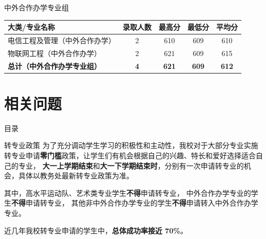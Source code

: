 \documentclass[aspectratio=169, utf8, fontset=windows]{beamer}
\begin{document}
\begin{frame}{中外合作办学专业组}
    \begin{table}
        \centering
        \begin{tabular}{lcccc}
            \toprule
            \textcolor{Fore}{\textbf{大类/专业名称}}       & \textcolor{Fore}{\textbf{录取人数}} & \textcolor{Fore}{\textbf{最高分}} & \textcolor{Fore}{\textbf{最低分}} & \textcolor{Fore}{\textbf{平均分}} \\ \midrule
            电信工程及管理（中外合作办学）                          & 2                               & 610                            & 609                            & 610                            \\
            物联网工程（中外合作办学）                            & 2                               & 621                            & 609                            & 615                            \\
            \textcolor{Fore}{\textbf{总计（中外合作办学专业组）}} & \textcolor{Fore}{\textbf{4}}    & \textcolor{Fore}{\textbf{621}} & \textcolor{Fore}{\textbf{609}} & \textcolor{Fore}{\textbf{612}} \\ \midrule
        \end{tabular}
    \end{table}
\end{frame}

\section{相关问题}

\begin{frame}{目录}
    \begin{multicols}{2}
        \tableofcontents[currentsection]
    \end{multicols}
\end{frame}

\begin{frame}{转专业政策}
    为了充分调动学生学习的积极性和主动性，我校对于大部分专业实施转专业申请\textcolor{Fore}{\textbf{零门槛}}政策，让学生们有机会根据自己的兴趣、特长和爱好选择适合自己的专业，
    \textcolor{Fore}{\textbf{大一上学期结束}}和\textcolor{Fore}{\textbf{大一下学期结束时}}，分别有一次申请转专业的机会，具体以教务处最新转专业政策为准。

    其中，高水平运动队、艺术类专业学生\textcolor{Fore}{\textbf{不得}}申请转专业，
    中外合作办学专业的学生\textcolor{Fore}{\textbf{不得}}申请转专业，
    其他非中外合作办学专业的学生\textcolor{Fore}{\textbf{不得}}申请转入中外合作办学专业。

    近几年我校转专业申请的学生中，\textcolor{Fore}{\textbf{总体成功率接近 70\%}}。
\end{frame}
\end{document}
